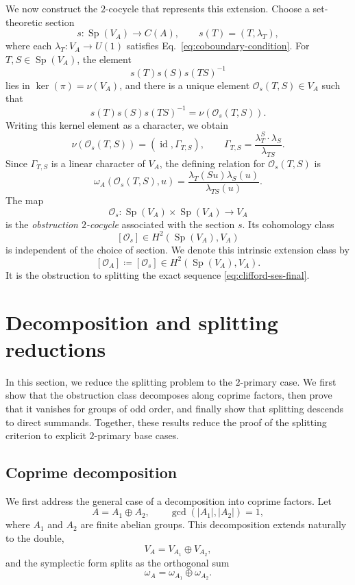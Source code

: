 \documentclass[11pt, reqno]{amsart}
\theoremstyle{definition}
\theoremstyle{remark}
\newcommand{\cO}{\mathcal{O}}
\DeclareMathOperator{\Sp}{Sp}
\DeclareMathOperator{\id}{id}
\begin{document}
We now construct the $2$-cocycle that represents this extension. Choose a set-theoretic section
\[
s:\Sp(V_A)\to C(A), \qquad s(T)=(T,\lambda_T),
\]
where each $\lambda_T:V_A\to U(1)$ satisfies Eq.~\eqref{eq:coboundary-condition}. For $T,S\in\Sp(V_A)$, the element
\[
s(T)s(S)s(TS)^{-1}
\]
lies in $\ker(\pi)=\nu(V_A)$, and there is a unique element $\cO_s(T,S)\in V_A$ such that
\[
s(T)s(S)s(TS)^{-1}=\nu(\cO_s(T,S)).
\]
Writing this kernel element as a character, we obtain
\begin{equation*}
\nu(\cO_s(T,S))=(\id,\Gamma_{T,S}), \qquad \Gamma_{T,S}=\frac{\lambda_T^S\cdot\lambda_S}{\lambda_{TS}}.
\end{equation*}
Since $\Gamma_{T,S}$ is a linear character of $V_A$, the defining relation for $\cO_s(T,S)$ is
\begin{equation}\label{eq:obstruction-def}
\omega_A(\cO_s(T,S),u)=\frac{\lambda_T(Su)\lambda_S(u)}{\lambda_{TS}(u)}.
\end{equation}
The map
\[
\cO_s:\Sp(V_A)\times\Sp(V_A)\to V_A
\]
is the \emph{obstruction $2$-cocycle} associated with the section $s$. Its cohomology class
\[
[\cO_s]\in H^2(\Sp(V_A),V_A)
\]
is independent of the choice of section. We denote this intrinsic extension class by
\[
[\cO_A]\coloneqq [\cO_s]\in H^2(\Sp(V_A),V_A).
\]
It is the obstruction to splitting the exact sequence \eqref{eq:clifford-ses-final}.

\section{Decomposition and splitting reductions}\label{sec:decomposition_reduction}

In this section, we reduce the splitting problem to the $2$-primary case. We first show that the obstruction class decomposes along coprime factors, then prove that it vanishes for groups of odd order, and finally show that splitting descends to direct summands. Together, these results reduce the proof of the splitting criterion to explicit $2$-primary base cases.

\subsection{Coprime decomposition}

We first address the general case of a decomposition into coprime factors. Let
\[
A = A_1 \oplus A_2,
\qquad \gcd(|A_1|,|A_2|)=1,
\]
where $A_1$ and $A_2$ are finite abelian groups. This decomposition extends naturally to the double,
\[
V_A = V_{A_1} \oplus V_{A_2},
\]
and the symplectic form splits as the orthogonal sum
\[
\omega_A=\omega_{A_1}\oplus\omega_{A_2}.
\]
\end{document}
